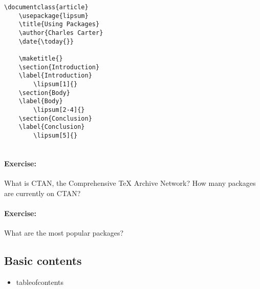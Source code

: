         \begin{verbatim}
\documentclass{article}
    \usepackage{lipsum}
    \title{Using Packages}
    \author{Charles Carter}
    \date{\today{}}
 
    \maketitle{}
    \section{Introduction}
    \label{Introduction}
        \lipsum[1]{}
    \section{Body}
    \label{Body}
        \lipsum[2-4]{}
    \section{Conclusion}
    \label{Conclusion}
        \lipsum[5]{}
    
        \end{verbatim}

        \paragraph{Exercise:}What is CTAN, the Comprehensive \TeX{} Archive Network? How many packages are currently on CTAN?

        \paragraph{Exercise:}What are the most popular \LaTeXe{} packages?

        \subsection{Basic contents}
        \label{Basic contents}
        
        \begin{framed}
            \begin{itemize}
                \item{tableofcontents}
            \end{itemize}
        \end{framed}

